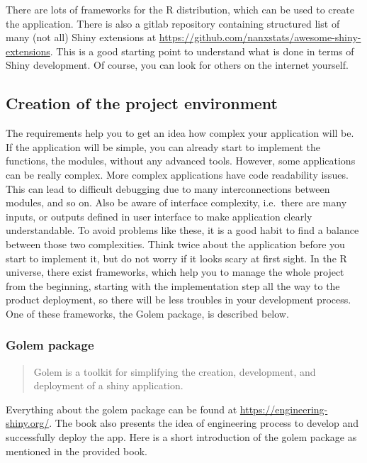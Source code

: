 \documentclass[
]{article}
\begin{document}
There are lots of frameworks for the R distribution, which can be used
to create the application. There is also a gitlab repository containing
structured list of many (not all) Shiny extensions at
\url{https://github.com/nanxstats/awesome-shiny-extensions}. This is a
good starting point to understand what is done in terms of Shiny
development. Of course, you can look for others on the internet
yourself.

\hypertarget{creation-of-the-project-environment}{%
\subsection{Creation of the project
environment}\label{creation-of-the-project-environment}}

The requirements help you to get an idea how complex your application
will be. If the application will be simple, you can already start to
implement the functions, the modules, without any advanced tools.
However, some applications can be really complex. More complex
applications have code readability issues. This can lead to difficult
debugging due to many interconnections between modules, and so on. Also
be aware of interface complexity, i.e.~there are many inputs, or outputs
defined in user interface to make application clearly understandable. To
avoid problems like these, it is a good habit to find a balance between
those two complexities. Think twice about the application before you
start to implement it, but do not worry if it looks scary at first
sight. In the R universe, there exist frameworks, which help you to
manage the whole project from the beginning, starting with the
implementation step all the way to the product deployment, so there will
be less troubles in your development process. One of these frameworks,
the Golem package, is described below.

\hypertarget{golem-package}{%
\subsubsection{Golem package}\label{golem-package}}

\begin{quote}
Golem is a toolkit for simplifying the creation, development, and
deployment of a shiny application.
\end{quote}

Everything about the golem package can be found at
\href{https://engineering-shiny.org/golem.html}{https://engineering-shiny.org/}.
The book also presents the idea of engineering process to develop and
successfully deploy the app. Here is a short introduction of the golem
package as mentioned in the provided book.
\end{document}
